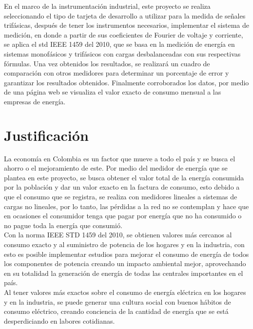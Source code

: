 En el marco de la instrumentación industrial, este proyecto se realiza seleccionando el tipo de tarjeta de desarrollo a utilizar para la medida de señales trifásicas, después de tener los instrumentos necesarios, implementar el sistema de medición, en donde a partir de sus coeficientes de Fourier de voltaje y corriente, se aplica el std IEEE 1459 del 2010, que se basa en la medición de energía en sistemas monofásicos y trifásicos con cargas desbalanceadas con sus respectivas fórmulas. Una vez obtenidos los resultados, se realizará un cuadro de comparación con otros medidores para determinar un porcentaje de error y garantizar los resultados obtenidos. Finalmente corroborados los datos, por medio de una página web se visualiza el valor exacto de consumo mensual a las empresas de energía. \\



\newpage{\clearpage}
\chapter{ Justificación}

La economía en Colombia es un factor que mueve a todo el país y se busca el ahorro o el mejoramiento de este. Por medio del medidor de energía que se plantea en este proyecto, se busca obtener el valor total de la energía consumida por la población y dar un valor exacto en la factura de consumo, esto debido a que el consumo que se registra, se realiza con medidores lineales a sistemas de cargas no lineales, por lo tanto, las pérdidas a la red no se contemplan y hace que en ocasiones el consumidor tenga que pagar por energía que no ha consumido o no pague toda la energía que consumió.\\

Con la norma IEEE STD 1459 del 2010, se obtienen valores más cercanos al consumo exacto y al suministro de potencia de los hogares y en la industria, con esto es posible implementar estudios para mejorar el consumo de energía de todos los componentes de potencia creando un impacto ambiental mejor, aprovechando en su totalidad la generación de energía de todas las centrales importantes en el país.\\
 
Al tener valores más exactos sobre el consumo de energía eléctrica en los hogares y en la industria, se puede generar una cultura social con buenos hábitos de consumo eléctrico, creando conciencia de la cantidad de energía que se está desperdiciando en labores cotidianas.\\

